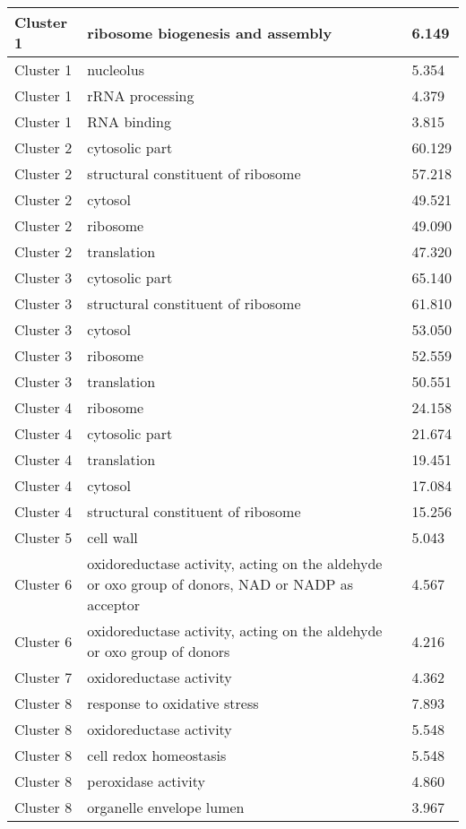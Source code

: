 {\begin{longtable}{|p{1in}|p{4in}|p{1in}|}
\hline
Cluster 1 & ribosome biogenesis and assembly & 6.149 \\ \hline
Cluster 1 & nucleolus & 5.354 \\ \hline
Cluster 1 & rRNA processing & 4.379 \\ \hline
Cluster 1 & RNA binding & 3.815 \\ \hline
Cluster 2 & cytosolic part & 60.129 \\ \hline
Cluster 2 & structural constituent of ribosome & 57.218 \\ \hline
Cluster 2 & cytosol & 49.521 \\ \hline
Cluster 2 & ribosome & 49.090 \\ \hline
Cluster 2 & translation & 47.320 \\ \hline
Cluster 3 & cytosolic part & 65.140 \\ \hline
Cluster 3 & structural constituent of ribosome & 61.810 \\ \hline
Cluster 3 & cytosol & 53.050 \\ \hline
Cluster 3 & ribosome & 52.559 \\ \hline
Cluster 3 & translation & 50.551 \\ \hline
Cluster 4 & ribosome & 24.158 \\ \hline
Cluster 4 & cytosolic part & 21.674 \\ \hline
Cluster 4 & translation & 19.451 \\ \hline
Cluster 4 & cytosol & 17.084 \\ \hline
Cluster 4 & structural constituent of ribosome & 15.256 \\ \hline
Cluster 5 & cell wall & 5.043 \\ \hline
Cluster 6 & oxidoreductase activity, acting on the aldehyde or oxo group of donors, NAD or NADP as acceptor & 4.567 \\ \hline
Cluster 6 & oxidoreductase activity, acting on the aldehyde or oxo group of donors & 4.216 \\ \hline
Cluster 7 & oxidoreductase activity & 4.362 \\ \hline
Cluster 8 & response to oxidative stress & 7.893 \\ \hline
Cluster 8 & oxidoreductase activity & 5.548 \\ \hline
Cluster 8 & cell redox homeostasis & 5.548 \\ \hline
Cluster 8 & peroxidase activity & 4.860 \\ \hline
Cluster 8 & organelle envelope lumen & 3.967 \\ \hline

\end{longtable}}
